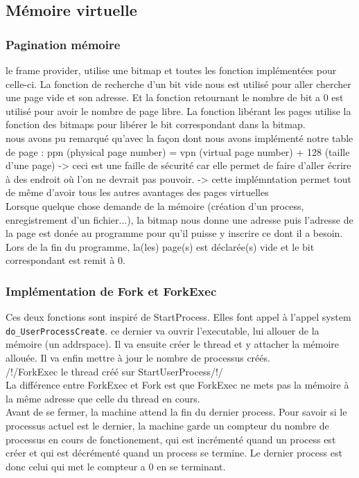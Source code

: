 \documentclass{article}
\begin{document}
	\subsection{Mémoire virtuelle}
		\subsubsection{Pagination mémoire}
			le frame provider, utilise une bitmap et toutes les fonction implémentées pour celle-ci. La fonction de recherche d'un bit vide nous est utilisé pour aller chercher une page vide et son adresse. Et la fonction retournant le nombre de bit a 0 est utilisé pour avoir le nombre de page libre. La fonction libérant les pages utilise la fonction des bitmaps pour libérer le bit correspondant dans la bitmap.\\
			nous avons pu remarqué qu'avec la façon dont nous avons implémenté notre table de page : ppn (physical page number) = vpn (virtual page number) + 128 (taille d'une page)
				-> ceci est une faille de sécurité car elle permet de faire d'aller écrire à des endroit où l'on ne devrait pas pouvoir.
				-> cette implémntation permet tout de même d'avoir tous les autres avantages des pages virtuelles\\
			Lorsque quelque chose demande de la mémoire (création d'un process, enregistrement d'un fichier...), la bitmap nous donne une adresse puis l'adresse de la page est donée au programme pour qu'il puisse y inscrire ce dont il a besoin.\\
			Lors de la fin du programme, la(les) page(s) est déclarée(s) vide et le bit correspondant est remit à 0.
		\subsubsection{Implémentation de Fork et ForkExec}
			{Ces deux fonctions sont inspiré de StartProcess. Elles font appel à l'appel system \texttt{do\_UserProcessCreate}. ce dernier va ouvrir l'executable, lui allouer de la mémoire (un addrspace). Il va ensuite créer le thread et y attacher la mémoire allouée. Il va enfin mettre à jour le nombre de processus créés.
			\\ /!/ForkExec le thread créé sur StartUserProcess/!/
			\\ La différence entre ForkExec et Fork est que ForkExec ne mets pas la mémoire à la même adresse que celle du thread en cours.
			\\ Avant de se fermer, la machine attend la fin du dernier process. Pour savoir si le processus actuel est le dernier, la machine garde un compteur du nombre de processus en cours de fonctionement, qui est incrémenté quand un process est créer et qui est décrémenté quand un process se termine. Le dernier process est donc celui qui met le compteur a $0$ en se terminant.}
\end{document}
